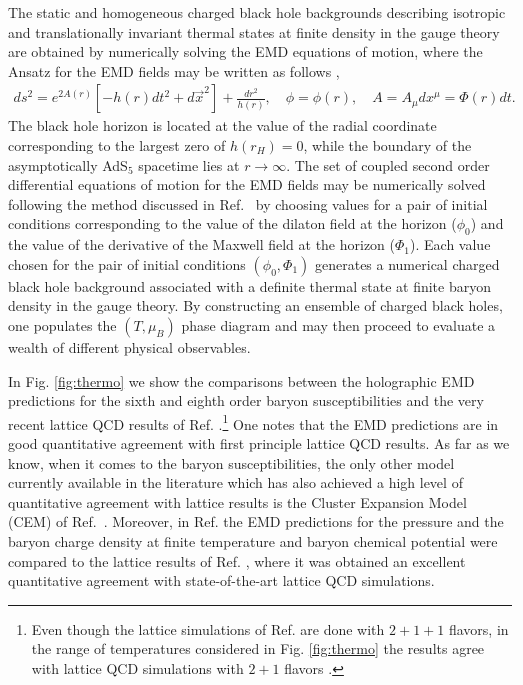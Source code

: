 \documentclass[aps,prd,showkeys,superscriptaddress,singlecolumn,nofootinbib,floatfix]{revtex4-1}
\begin{document}
The static and homogeneous charged black hole backgrounds describing isotropic and translationally invariant thermal states at finite density in the gauge theory are obtained by numerically solving the EMD equations of motion, where the Ansatz for the EMD fields may be written as follows \cite{DeWolfe:2010he},
\begin{align}
ds^2=e^{2A(r)} \left[ -h(r)dt^2+d\vec{x}^2 \right] +\frac{dr^2}{h(r)}, \quad
\phi=\phi(r), \quad A=A_\mu dx^\mu=\Phi(r)dt. \label{eq:EMDansatz}
\end{align}
The black hole horizon is located at the value of the radial coordinate corresponding to the largest zero of $h(r_H)=0$, while the boundary of the asymptotically AdS$_5$ spacetime lies at $r\rightarrow\infty$. The set of coupled second order differential equations of motion for the EMD fields may be numerically solved following the method discussed in Ref.\ \cite{Critelli:2017oub} by choosing values for a pair of initial conditions corresponding to the value of the dilaton field at the horizon ($\phi_0$) and the value of the derivative of the Maxwell field at the horizon ($\Phi_1$). Each value chosen for the pair of initial conditions $(\phi_0,\Phi_1)$ generates a numerical charged black hole background associated with a definite thermal state at finite baryon density in the gauge theory. By constructing an ensemble of charged black holes, one populates the $(T,\mu_B)$ phase diagram and may then proceed to evaluate a wealth of different physical observables.

In Fig. \ref{fig:thermo} we show the comparisons between the holographic EMD predictions for the sixth and eighth order baryon susceptibilities \cite{Critelli:2017oub} and the very recent lattice QCD results of Ref. \cite{Borsanyi:2018grb}.\footnote{Even though the lattice simulations of Ref. \cite{Borsanyi:2018grb} are done with $2+1+1$ flavors, in the range of temperatures considered in Fig. \ref{fig:thermo} the results agree with lattice QCD simulations with $2+1$ flavors \cite{Borsanyi:2016ksw}.} One notes that the EMD predictions are in good quantitative agreement with first principle lattice QCD results. As far as we know, when it comes to the baryon susceptibilities, the only other model currently available in the literature which has also achieved a high level of quantitative agreement with lattice results is the Cluster Expansion Model (CEM) of Ref.\ \cite{Vovchenko:2017gkg}. Moreover, in Ref. \cite{Critelli:2017oub} the EMD predictions for the pressure and the baryon charge density at finite temperature and baryon chemical potential were compared to the lattice results of Ref. \cite{Bazavov:2017dus}, where it was obtained an excellent quantitative agreement with state-of-the-art lattice QCD simulations.
\end{document}

